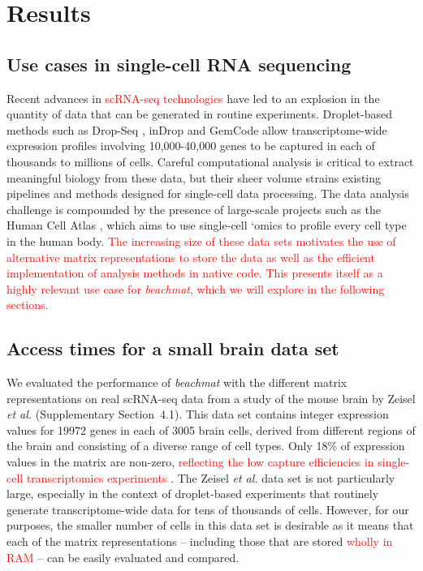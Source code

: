 \documentclass[10pt,letterpaper]{article}
\newcommand{\suppsecrealzeisel}{4.1}
\newcommand{\beachmat}{\textit{beachmat}}
\newcommand{\revised}[1]{\textcolor{red}{#1}}
\begin{document}
\section*{Results}

\subsection*{Use cases in single-cell RNA sequencing}
Recent advances in \revised{scRNA-seq technologies} have led to an explosion in the quantity of data that can be generated in routine experiments.
Droplet-based methods such as Drop-Seq \cite{macosko2015highly}, inDrop \cite{klein2015droplet} and GemCode \cite{zheng2017massively} allow transcriptome-wide expression profiles involving 10,000-40,000 genes to be captured in each of thousands to millions of cells.
Careful computational analysis is critical to extract meaningful biology from these data, but their sheer volume strains existing pipelines and methods designed for single-cell data processing.
The data analysis challenge is compounded by the presence of large-scale projects such as the Human Cell Atlas \cite{regev2017human}, which aims to use single-cell `omics to profile every cell type in the human body.
\revised{The increasing size of these data sets motivates the use of alternative matrix representations to store the data as well as the efficient implementation of analysis methods in native code.
This presents itself as a highly relevant use case for \beachmat{}, which we will explore in the following sections.}

\subsection*{Access times for a small brain data set}
We evaluated the performance of \beachmat{} with the different matrix representations on real scRNA-seq data from a study of the mouse brain by Zeisel \textit{et al.} \cite{zeisel2015brain} (Supplementary Section~\suppsecrealzeisel{}). 
This data set contains integer expression values for 19972 genes in each of 3005 brain cells, derived from different regions of the brain and consisting of a diverse range of cell types.
Only 18\% of expression values in the matrix are non-zero, \revised{reflecting the low capture efficiencies in single-cell transcriptomics experiments} \cite{grun2015design}.
The Zeisel \textit{et al.} data set is not particularly large, especially in the context of droplet-based experiments that routinely generate transcriptome-wide data for tens of thousands of cells.
However, for our purposes, the smaller number of cells in this data set is desirable as it means that each of the matrix representations -- including those that are stored \revised{wholly in RAM} -- can be easily evaluated and compared.
\end{document}
